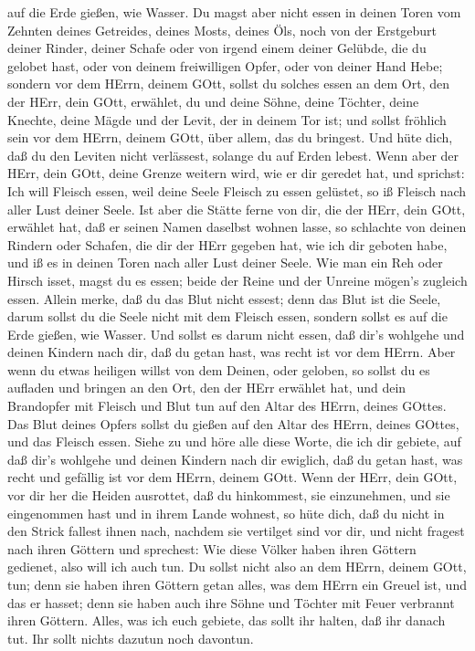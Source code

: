 auf die Erde gießen, wie Wasser.  Du magst aber nicht essen
in deinen Toren vom Zehnten deines Getreides, deines Mosts, deines Öls,
noch von der Erstgeburt deiner Rinder, deiner Schafe oder von irgend
einem deiner Gelübde, die du gelobet hast, oder von deinem freiwilligen
Opfer, oder von deiner Hand Hebe;  sondern vor dem HErrn,
deinem GOtt, sollst du solches essen an dem Ort, den der HErr, dein
GOtt, erwählet, du und deine Söhne, deine Töchter, deine Knechte, deine
Mägde und der Levit, der in deinem Tor ist; und sollst fröhlich sein vor
dem HErrn, deinem GOtt, über allem, das du bringest.  Und
hüte dich, daß du den Leviten nicht verlässest, solange du auf Erden
lebest.  Wenn aber der HErr, dein GOtt, deine Grenze
weitern wird, wie er dir geredet hat, und sprichst: Ich will Fleisch
essen, weil deine Seele Fleisch zu essen gelüstet, so iß Fleisch nach
aller Lust deiner Seele.  Ist aber die Stätte ferne von
dir, die der HErr, dein GOtt, erwählet hat, daß er seinen Namen daselbst
wohnen lasse, so schlachte von deinen Rindern oder Schafen, die dir der
HErr gegeben hat, wie ich dir geboten habe, und iß es in deinen Toren
nach aller Lust deiner Seele.  Wie man ein Reh oder Hirsch
isset, magst du es essen; beide der Reine und der Unreine mögen's
zugleich essen.  Allein merke, daß du das Blut nicht
essest; denn das Blut ist die Seele, darum sollst du die Seele nicht mit
dem Fleisch essen,  sondern sollst es auf die Erde gießen,
wie Wasser.  Und sollst es darum nicht essen, daß dir's
wohlgehe und deinen Kindern nach dir, daß du getan hast, was recht ist
vor dem HErrn.  Aber wenn du etwas heiligen willst von dem
Deinen, oder geloben, so sollst du es aufladen und bringen an den Ort,
den der HErr erwählet hat,  und dein Brandopfer mit Fleisch
und Blut tun auf den Altar des HErrn, deines GOttes. Das Blut deines
Opfers sollst du gießen auf den Altar des HErrn, deines GOttes, und das
Fleisch essen.  Siehe zu und höre alle diese Worte, die ich
dir gebiete, auf daß dir's wohlgehe und deinen Kindern nach dir
ewiglich, daß du getan hast, was recht und gefällig ist vor dem HErrn,
deinem GOtt.  Wenn der HErr, dein GOtt, vor dir her die
Heiden ausrottet, daß du hinkommest, sie einzunehmen, und sie
eingenommen hast und in ihrem Lande wohnest,  so hüte dich,
daß du nicht in den Strick fallest ihnen nach, nachdem sie vertilget
sind vor dir, und nicht fragest nach ihren Göttern und sprechest: Wie
diese Völker haben ihren Göttern gedienet, also will ich auch tun.
 Du sollst nicht also an dem HErrn, deinem GOtt, tun; denn
sie haben ihren Göttern getan alles, was dem HErrn ein Greuel ist, und
das er hasset; denn sie haben auch ihre Söhne und Töchter mit Feuer
verbrannt ihren Göttern.  Alles, was ich euch gebiete, das
sollt ihr halten, daß ihr danach tut. Ihr sollt nichts dazutun noch
davontun.

